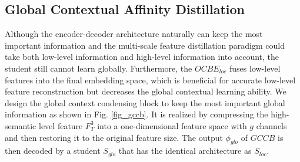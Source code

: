 \documentclass[10pt,twocolumn,letterpaper]{article}
\begin{document}
\subsection{Global Contextual Affinity Distillation}
Although the encoder-decoder architecture naturally can keep the most important information and the multi-scale feature distillation paradigm could take both low-level information and high-level information into account, the student still cannot learn globally. Furthermore, the $OCBE_{loc}$ fuses low-level features into the final embedding space, which is beneficial for accurate low-level feature reconstruction but decreases the global contextual learning ability. We design the global context condensing block to keep the most important global information as shown in Fig. \ref{fig_gccb}. It is realized by compressing the high-semantic level feature $F_T^3$ into a one-dimensional feature space with $g$ channels and then restoring it to the original feature size. The output $\phi_{glo}$ of $GCCB$ is then decoded by a student $S_{glo}$ that has the identical architecture as $S_{loc}$.
\end{document}
